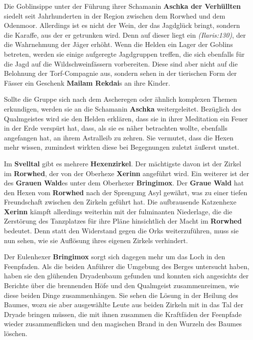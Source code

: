 \newpage

Die Goblinsippe unter der Führung ihrer Schamanin \textbf{Aschka der Verhüllten} siedelt seit Jahrhunderten in der Region zwischen dem Rorwhed und dem Odenmoor.
Allerdings ist es nicht der Wein, der das Jagdglück bringt, sondern die Karaffe, aus der er getrunken wird.
Denn auf dieser liegt ein   \emph{(Ilaris:130)}, der die Wahrnehmung der Jäger erhöht.
Wenn die Helden ein Lager der Goblins betreten, werden sie einige aufgeregte Jagdgruppen treffen, die sich ebenfalls für die Jagd auf die Wildschweinfässern vorbereiten.
Diese sind aber nicht auf die Belohnung der Torf-Compagnie aus, sondern sehen in der tierischen Form der Fässer ein Geschenk \textbf{Mailam Rekdai}s an ihre Kinder.

Sollte die Gruppe sich nach dem Ascheregen oder ähnlich komplexen Themen erkundigen, werden sie an die Schamanin \textbf{Aschka} weitergeleitet.
Bezüglich des Qualmgeistes wird sie den Helden erklären, dass sie in ihrer Meditation ein Feuer in der Erde verspürt hat, dass, als sie es näher betrachten wollte, ebenfalls angefangen hat, an ihrem Astralleib zu zehren.
Sie vermutet, dass die Hexen mehr wissen, zumindest wirkten diese bei Begegnungen zuletzt äußerst unstet.


\vfill

\neuespalte

Im \textbf{Svelltal} gibt es mehrere \textbf{Hexenzirkel}. Der mächtigste davon ist der Zirkel im \textbf{Rorwhed}, der von der Oberhexe \textbf{Xerinn} angeführt wird.
Ein weiterer ist der des \textbf{Grauen Wald}es unter dem Oberhexer \textbf{Bringimox}.
Der \textbf{Graue Wald} hat den Hexen vom \textbf{Rorwhed} nach der Sprengung Asyl gewährt, was zu einer tiefen Freundschaft zwischen den Zirkeln geführt hat.
Die aufbrausende Katzenhexe \textbf{Xerinn} kämpft allerdings weiterhin mit der fulminanten Niederlage, die die Zerstörung des Tanzplatzes für ihre Pläne hinsichtlich der Macht im \textbf{Rorwhed} bedeutet.
Denn statt den Widerstand gegen die Orks weiterzuführen, muss sie nun sehen, wie sie Auflösung ihres eigenen Zirkels verhindert.

Der Eulenhexer \textbf{Bringimox} sorgt sich dagegen mehr um das Loch in den Feenpfaden.
Als die beiden Anführer die Umgebung des Berges untersucht haben, haben sie den glühenden Dryadenbaum gefunden und konnten sich angesichts der Berichte über die brennenden Höfe und den Qualmgeist zusammenreimen, wie diese beiden Dinge zusammenhängen.
Sie sehen die Lösung in der Heilung des Baumes, wozu sie aber ausgewählte Leute aus beiden Zirkeln mit in das Tal der Dryade bringen müssen, die mit ihnen zusammen die Kraftfäden der Feenpfade wieder zusammenflicken und den magischen Brand in den Wurzeln des Baumes löschen.

